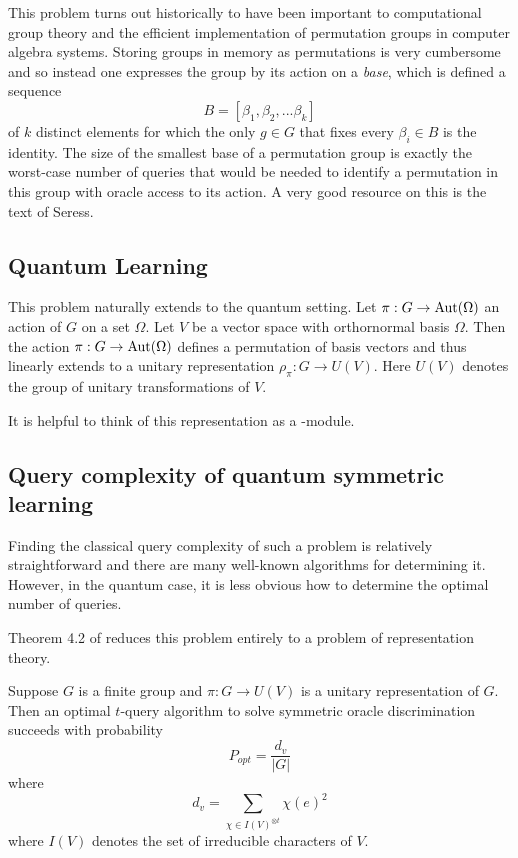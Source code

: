 \bigskip

This problem turns out historically to have been important to computational group theory and the efficient 
implementation of permutation groups in computer algebra systems. Storing groups in memory as permutations is very 
cumbersome and so instead one expresses the group by its action on a \emph{base}, which is defined a sequence
\[
    B = [\beta_1, \beta_2, ... \beta_k]
\]
of $k$ distinct elements for which the only $g\in G$ that fixes every $\beta_i \in B$ is the identity. The size of 
the smallest base of a permutation group is exactly the worst-case number of queries that would be needed to 
identify a permutation in this group with oracle access to its action. A very good resource on this is the text 
\cite{seress} of Seress. 


\subsection{Quantum Learning}

This problem naturally extends to the quantum setting. Let $\pi : G \rightarrow \operatorname{Aut}(\Omega)$ an action of $G$ on a 
set $\Omega$. Let $V$ be a vector space with orthornormal basis $\Omega$. Then the action $\pi : G \rightarrow 
\operatorname{Aut}(\Omega)$ defines a permutation of basis vectors and thus linearly extends to a unitary representation 
$\rho_\pi : G \rightarrow U(V)$. Here $U(V)$ denotes the group of unitary transformations of $V$.

It is helpful to think of this representation as a \CG-module. 



\subsection{Query complexity of quantum symmetric learning}
Finding the classical query complexity of such a problem is relatively straightforward and there are many 
well-known algorithms for determining it. However, in the quantum case, it is less obvious how to determine the 
optimal number of queries.

Theorem 4.2 of \cite{jamie} reduces this problem entirely to a problem of representation theory.
    
\begin{theorem}
    Suppose $G$ is a finite group and $\pi : G \rightarrow U(V)$ is a unitary representation of $G$. Then an 
    optimal $t$-query algorithm to solve symmetric oracle discrimination succeeds with probability
    \[
        P_{opt} = \frac{d_v}{|G|}
    \]
    where
    \[
        d_v = \sum_{\chi \in I(V)^{\otimes t}} \chi(e)^2
    \]
    where $I(V)$ denotes the set of irreducible characters of $V$.
\end{theorem}

